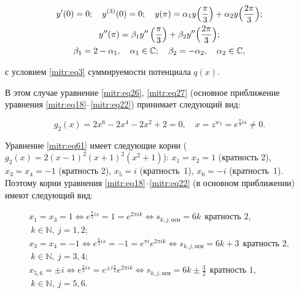 \begin{gather}

y'(0)=0; \quad y^{(3)}(0)=0; \quad y(\pi)=\alpha_1 y\Bigl(\frac\pi3\Bigr)+\alpha_2 y\Bigl(\frac{2\pi}3\Bigr);\notag \\

\label{mitr:eq60}

 y''(\pi)=\beta_1y''\left(\frac\pi3\right)+\beta_2y''\Bigl(\frac{2\pi}3\Bigr); \\

\beta_1=2-\alpha_1, \quad \alpha_1\in\mathbb{C}; \quad \beta_2=-\alpha_2, \quad \alpha_2\in\mathbb{C},\notag

\end{gather}

с условием \eqref{mitr:eq3} суммируемости потенциала $q(x)$.



В этом случае уравнение \eqref{mitr:eq26}, \eqref{mitr:eq27} (основное приближение уравнения \eqref{mitr:eq18}--\eqref{mitr:eq22}) принимает следующий вид:

\begin{equation}

\label{mitr:eq61}

g_2(x)=2x^6-2x^4-2x^2+2=0, \quad

x=z^{w_2}=e^{\frac\pi3 is}\ne0.

\end{equation}



Уравнение \eqref{mitr:eq61} имеет следующие корни ($g_2(x)=2(x-1)^2(x+1)^2(x^2+1)$): $x_1=x_2=1$ (кратность 2), $x_3=x_4=-1$ (кратность 2), $x_5=i$ (кратность~1), $x_6=-i$ (кратность~1). Поэтому корни уравнения \eqref{mitr:eq18}--\eqref{mitr:eq22} (в основном приближении) имеют следующий вид:

\begin{gather*}

x_1=x_3=1 \Leftrightarrow e^{\frac\pi3is}=1=e^{2\pi ik}\Leftrightarrow s_{k,j,\text{осн}} =6k \ \ \text{кратность 2},\\ \ k\in\mathbb{N}, \ j=1,2;\\

x_3=x_4=-1 \Leftrightarrow e^{\frac\pi3is}=-1=e^{\pi i}e^{2\pi ik}\Leftrightarrow s_{k,j,\text{осн}} =6k +3\ \ \text{кратность 2},\\ \ k\in\mathbb{N}, \ j=3,4;\\

x_{5,6}=\pm i \Leftrightarrow e^{\frac\pi3is}=e^{\pm i\frac\pi2}e^{2\pi ik}\Leftrightarrow s_{k,j,\text{осн}} =6k\pm \frac32 \ \ \text{кратность 1},\\ \ k\in\mathbb{N}, \ j=5,6.

\end{gather*}



